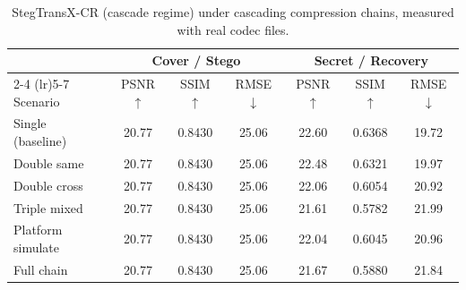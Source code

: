 \begin{table}[t]
\centering
\caption{StegTransX-CR (cascade regime) under cascading compression chains, measured with real codec files.}
\label{tab:cascade-cascade-real}
\begin{tabular}{lcccccc}
\toprule
& \multicolumn{3}{c}{Cover / Stego} & \multicolumn{3}{c}{Secret / Recovery} \\
\cmidrule(lr){2-4} \cmidrule(lr){5-7}
Scenario & PSNR $\uparrow$ & SSIM $\uparrow$ & RMSE $\downarrow$ & PSNR $\uparrow$ & SSIM $\uparrow$ & RMSE $\downarrow$ \\
\midrule
Single (baseline) & 20.77 & 0.8430 & 25.06 & 22.60 & 0.6368 & 19.72 \\
Double same & 20.77 & 0.8430 & 25.06 & 22.48 & 0.6321 & 19.97 \\
Double cross & 20.77 & 0.8430 & 25.06 & 22.06 & 0.6054 & 20.92 \\
Triple mixed & 20.77 & 0.8430 & 25.06 & 21.61 & 0.5782 & 21.99 \\
Platform simulate & 20.77 & 0.8430 & 25.06 & 22.04 & 0.6045 & 20.96 \\
Full chain & 20.77 & 0.8430 & 25.06 & 21.67 & 0.5880 & 21.84 \\
\bottomrule
\end{tabular}
\end{table}
